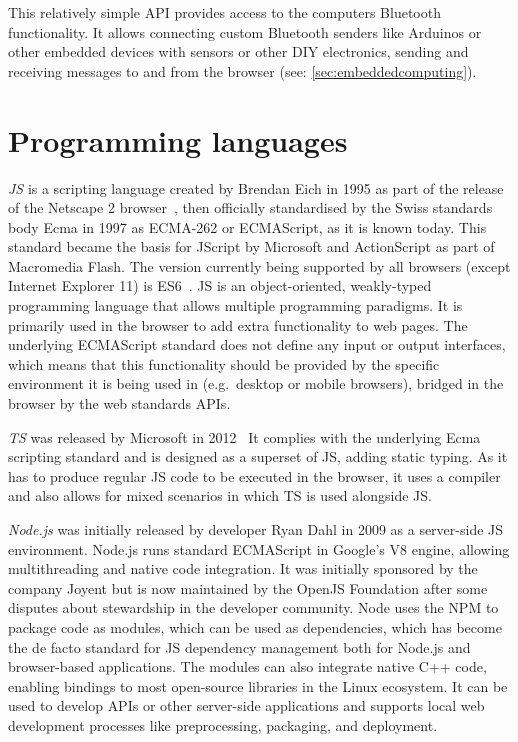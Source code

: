 This relatively simple \ac{API} provides access to the computer\textquotesingle s Bluetooth functionality.
It allows connecting custom Bluetooth senders like Arduinos or other embedded devices with sensors or other \ac{DIY} electronics, sending and receiving messages to and from the browser (see: \autoref{sec:embeddedcomputing}).

\section{Programming languages}
\label{sec:programming-languages}



\emph{\ac{JS}} is a scripting language created by Brendan Eich in 1995 as part of the release of the Netscape 2 browser~\parencite{javascriptRelease}, then officially standardised by the Swiss standards body Ecma in 1997 as ECMA-262 or ECMAScript, as it is known today.
This standard became the basis for JScript by Microsoft and ActionScript as part of Macromedia Flash.
The version currently being supported by all browsers (except Internet Explorer 11) is \ac{ES6}~\parencite{javascriptHistory}.
\ac{JS} is an object-oriented, weakly-typed programming language that allows multiple programming paradigms.
It is primarily used in the browser to add extra functionality to web pages.
The underlying ECMAScript standard does not define any input or output interfaces, which means that this functionality should be provided by the specific environment it is being used in (e.g.\ desktop or mobile browsers), bridged in the browser by the web standards \acp{API}.

\emph{\ac{TS}} was released by Microsoft in 2012~ It complies with the underlying Ecma scripting standard and is designed as a superset of \ac{JS}, adding static typing.
As it has to produce regular \ac{JS} code to be executed in the browser, it uses a compiler and also allows for mixed scenarios in which \ac{TS} is used alongside \ac{JS}.

\emph{Node.js} was initially released by developer Ryan Dahl in 2009 as a server-side \ac{JS} environment.
Node.js runs standard ECMAScript in Google's V8 engine, allowing multithreading and native code integration.
It was initially sponsored by the company Joyent but is now maintained by the OpenJS Foundation after some disputes about stewardship in the developer community.
Node uses the \ac{NPM} to package code as modules, which can be used as dependencies, which has become the de facto standard for \ac{JS} dependency management both for Node.js and browser-based applications.
The modules can also integrate native C++ code, enabling bindings to most open-source libraries in the Linux ecosystem.
It can be used to develop \acp{API} or other server-side applications and supports local web development processes like preprocessing, packaging, and deployment.

